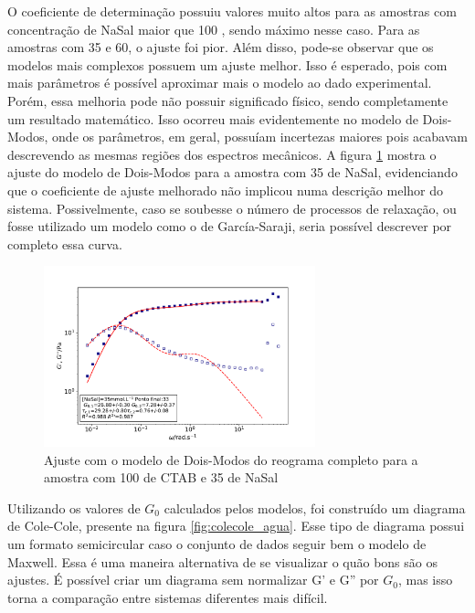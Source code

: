 	O coeficiente de determinação possuiu valores muito altos para as amostras com concentração de NaSal maior que 100 \mM, sendo máximo nesse caso. Para as amostras com 35 e 60, o ajuste foi pior. Além disso, pode-se observar que os modelos mais complexos possuem um ajuste melhor. Isso é esperado, pois com mais parâmetros é possível aproximar mais o modelo ao dado experimental. Porém, essa melhoria pode não possuir significado físico, sendo completamente um resultado matemático. Isso ocorreu mais evidentemente no modelo de Dois-Modos, onde os parâmetros, em geral, possuíam incertezas maiores pois acabavam descrevendo as mesmas regiões dos espectros mecânicos. A figura \ref{fig:ajuste_tm_35} mostra o ajuste do modelo de Dois-Modos para a amostra com 35 \mM{} de NaSal, evidenciando que o coeficiente de ajuste melhorado não implicou numa descrição melhor do sistema. Possivelmente, caso se soubesse o número de processos de relaxação, ou fosse utilizado um modelo como o de García-Saraji, seria possível descrever por completo essa curva. %
	
	\begin{figure}[h]
		\centering
		\includegraphics[width=0.7\textwidth]{imagens/reologia/ajuste_TM_35}
		\caption{Ajuste com o modelo de Dois-Modos do reograma completo para a amostra com 100 \mM{} de CTAB e 35 \mM{} de NaSal}
		\label{fig:ajuste_tm_35}
	\end{figure}
	
	
	Utilizando os valores de \(G_0\) calculados pelos modelos, foi construído um diagrama de Cole-Cole, presente na figura \ref{fig:colecole_agua}. Esse tipo de diagrama possui um formato semicircular caso o conjunto de dados seguir bem o modelo de Maxwell. Essa é uma maneira alternativa de se visualizar o quão bons são os ajustes. É possível criar um diagrama sem normalizar G' e G'' por \(G_0\), mas isso torna a comparação entre sistemas diferentes mais difícil.

